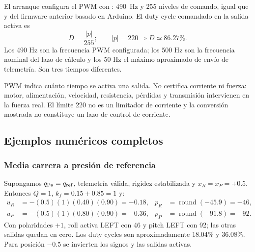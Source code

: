 El arranque configura el PWM con : 490~Hz y 255 niveles de comando, igual que  y  del firmware anterior basado en Arduino. El duty cycle comandado en la salida activa es
\begin{equation}
D=\frac{|p|}{255};\qquad |p|=220\Longrightarrow D\simeq86.27\%.
\end{equation}
Los 490 Hz son la frecuencia PWM configurada; los 500 Hz son la frecuencia nominal del lazo de cálculo y los 50 Hz el máximo aproximado de envío de telemetría. Son tres tiempos diferentes.

PWM indica cuánto tiempo se activa una salida. No certifica corriente ni fuerza: motor, alimentación, velocidad, resistencia, pérdidas y transmisión intervienen en la fuerza real. El límite 220 no es un limitador de corriente y la conversión mostrada no constituye un lazo de control de corriente.

\subsection{Ejemplos numéricos completos}
\subsubsection{Media carrera a presión de referencia}
Supongamos $q_{\rm Pa}=q_{\rm ref}$, telemetría válida, rigidez estabilizada y $x_R=x_P=+0.5$. Entonces $Q=1$, $k_f=0.15+0.85=1$ y:
\begin{align*}
u_R&=-(0.5)(1)(0.40)(0.90)=-0.18, &p_R&=\operatorname{round}(-45.9)=-46,\\
u_P&=-(0.5)(1)(0.80)(0.90)=-0.36, &p_P&=\operatorname{round}(-91.8)=-92.
\end{align*}
Con polaridades $+1$, roll activa LEFT con 46 y pitch LEFT con 92; las otras salidas quedan en cero. Los duty cycles son aproximadamente 18.04\% y 36.08\%. Para posición $-0.5$ se invierten los signos y las salidas activas.

